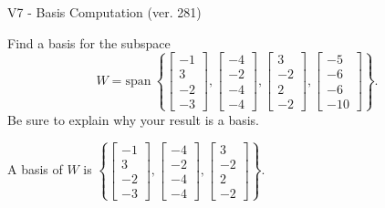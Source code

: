 \begin{exercise}
  \begin{exerciseTitle}V7 - Basis Computation (ver. 281)\end{exerciseTitle}
  \begin{exerciseStatement}
    Find a basis for the subspace 
\[W=\mathrm{span}\ \left\{\left[\begin{array}{r}
-1 \\
3 \\
-2 \\
-3
\end{array}\right] , \left[\begin{array}{r}
-4 \\
-2 \\
-4 \\
-4
\end{array}\right] , \left[\begin{array}{r}
3 \\
-2 \\
2 \\
-2
\end{array}\right] , \left[\begin{array}{r}
-5 \\
-6 \\
-6 \\
-10
\end{array}\right]\right\}.\]
 Be sure to explain why your result is a basis.


  \end{exerciseStatement}
  \begin{exerciseAnswer}
   A basis of \(W\) is  \(\left\{\left[\begin{array}{r}
-1 \\
3 \\
-2 \\
-3
\end{array}\right] , \left[\begin{array}{r}
-4 \\
-2 \\
-4 \\
-4
\end{array}\right] , \left[\begin{array}{r}
3 \\
-2 \\
2 \\
-2
\end{array}\right]\right\}\).
  


  \end{exerciseAnswer}
\end{exercise}